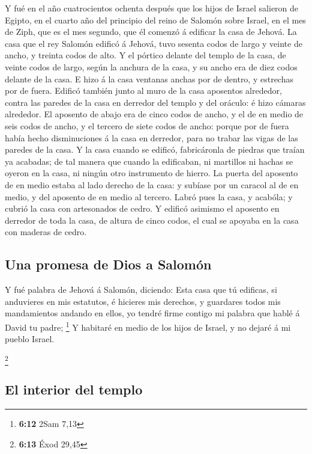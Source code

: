  Y fué en el año cuatrocientos ochenta después que los
hijos de Israel salieron de Egipto, en el cuarto año del principio del
reino de Salomón sobre Israel, en el mes de Ziph, que es el mes segundo,
que él comenzó á edificar la casa de Jehová.  La casa que
el rey Salomón edificó á Jehová, tuvo sesenta codos de largo y veinte de
ancho, y treinta codos de alto.  Y el pórtico delante del
templo de la casa, de veinte codos de largo, según la anchura de la
casa, y su ancho era de diez codos delante de la casa.  E
hizo á la casa ventanas anchas por de dentro, y estrechas por de fuera.
 Edificó también junto al muro de la casa aposentos
alrededor, contra las paredes de la casa en derredor del templo y del
oráculo: é hizo cámaras alrededor.  El aposento de abajo
era de cinco codos de ancho, y el de en medio de seis codos de ancho, y
el tercero de siete codos de ancho: porque por de fuera había hecho
disminuciones á la casa en derredor, para no trabar las vigas de las
paredes de la casa.  Y la casa cuando se edificó,
fabricáronla de piedras que traían ya acabadas; de tal manera que cuando
la edificaban, ni martillos ni hachas se oyeron en la casa, ni ningún
otro instrumento de hierro.  La puerta del aposento de en
medio estaba al lado derecho de la casa: y subíase por un caracol al de
en medio, y del aposento de en medio al tercero.  Labró
pues la casa, y acabóla; y cubrió la casa con artesonados de cedro.
 Y edificó asimismo el aposento en derredor de toda la
casa, de altura de cinco codos, el cual se apoyaba en la casa con
maderas de cedro.

\hypertarget{una-promesa-de-dios-a-salomuxf3n}{%
\subsection{Una promesa de Dios a
Salomón}\label{una-promesa-de-dios-a-salomuxf3n}}

 Y fué palabra de Jehová á Salomón, diciendo:
 Esta casa que tú edificas, si anduvieres en mis
estatutos, é hicieres mis derechos, y guardares todos mis mandamientos
andando en ellos, yo tendré firme contigo mi palabra que hablé á David
tu padre; \footnote{\textbf{6:12} 2Sam 7,13}  Y habitaré
en medio de los hijos de Israel, y no dejaré á mi pueblo Israel.

\footnote{\textbf{6:13} Éxod 29,45}

\hypertarget{el-interior-del-templo}{%
\subsection{El interior del templo}\label{el-interior-del-templo}}


